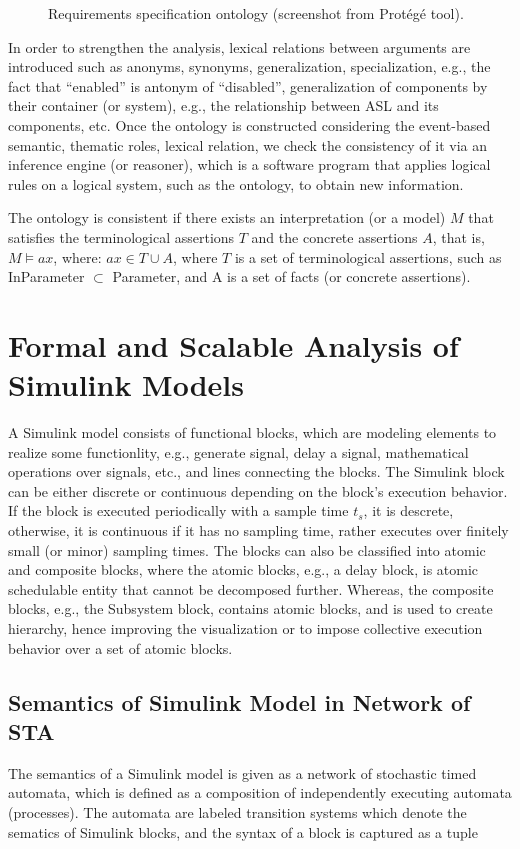 \begin{figure}[h]
{} 
	\caption{Requirements specification ontology (screenshot from Prot\'eg\'e tool).} \label{fig_ontology}
\end{figure}

In order to strengthen the analysis, lexical relations between arguments are introduced such as anonyms, synonyms, generalization, specialization, e.g., the fact that ``enabled'' is antonym of ``disabled'', generalization of components by their container (or system), e.g., the relationship between ASL and its components, etc. Once the ontology is constructed considering the event-based semantic, thematic roles, lexical relation, we check the consistency of it via an inference engine (or reasoner), which is a software program that applies logical rules on a logical system, such as the ontology, to obtain new information.
\begin{definition}
 The ontology is consistent if there exists an interpretation (or a model) $M$ that satisfies the terminological assertions $T$ and the concrete assertions $A$, that is, $M \models ax$, where: $ax \in T \cup A$, where $T$ is a set of terminological assertions, such as InParameter $\subset$ Parameter, and A is a set of facts (or concrete assertions).
\end{definition}

\section{Formal and Scalable Analysis of Simulink Models}\label{rc_sim}
A Simulink model consists of functional blocks, which are modeling elements to realize some functionlity, e.g., generate signal, delay a signal, mathematical operations over signals, etc., and lines connecting the blocks. The Simulink block can be either discrete or continuous depending on the block's execution behavior. If the block is executed periodically with a sample time $t_s$, it is descrete, otherwise, it is continuous if it has no sampling time, rather executes over finitely small (or minor) sampling times. The blocks can also be classified into atomic and composite blocks, where the atomic blocks, e.g., a delay block, is atomic schedulable entity that cannot be decomposed further. Whereas, the composite blocks, e.g., the Subsystem block, contains atomic blocks, and is used to create hierarchy, hence improving the visualization or to impose collective execution behavior over a set of atomic blocks. 

\subsection{Semantics of Simulink Model in Network of STA} 
The semantics of a Simulink model is given as a network of stochastic timed automata, which is defined as a composition of independently executing automata (processes). The automata are labeled transition systems which denote the sematics of Simulink blocks, and the syntax of a block is captured as a tuple 

